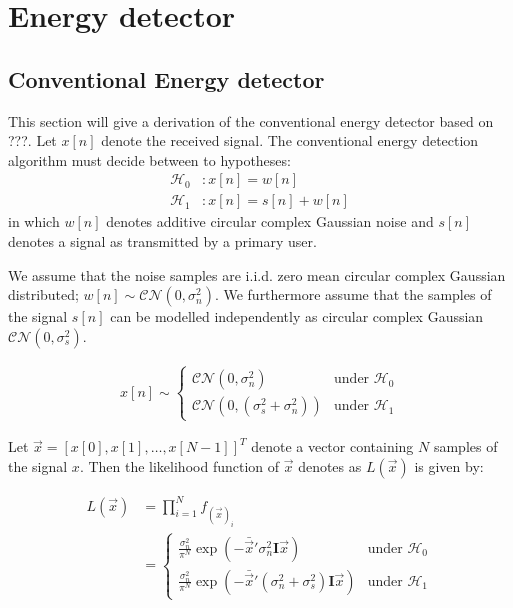 \documentclass[a4paper, openany, oneside]{memoir}
\begin{document}
\section{Energy detector}

\subsection{Conventional Energy detector}\label{ssec:conv_ed_derivation}
This section will give a derivation of the conventional energy detector based on ???.
Let $x[n]$ denote the received signal. The conventional energy detection algorithm must decide between to hypotheses:
\begin{align}\label{eq:hypotheses}
  \mathcal{H}_0&: x[n] = w[n]\\
  \mathcal{H}_1&: x[n] = s[n] + w[n]
\end{align}
in which $w[n]$ denotes additive circular complex Gaussian noise and $s[n]$ denotes a signal as transmitted by a primary user.

We assume that the noise samples are i.i.d. zero mean circular complex Gaussian distributed; $w[n] \sim \mathcal{CN}(0, \sigma_n^2)$. 
We furthermore assume that the samples of the signal $s[n]$ can be modelled independently as circular complex Gaussian $\mathcal{CN}(0, \sigma_s^2)$. %

\begin{align*}
x[n] \sim 
    \begin{cases}
        \mathcal{CN}(0, \sigma_n^2) & \text{under $\mathcal{H}_0$} \\
        \mathcal{CN}(0, (\sigma_s^2 + \sigma_n^2)) & \text{under $\mathcal{H}_1$}
    \end{cases}
\end{align*} 

Let $\vec{x} = \left[x[0], x[1], \ldots, x[N-1]\right]^T$ denote a vector containing $N$ samples of the signal $x$. Then the likelihood function of $\vec{x}$ denotes as $L(\vec{x})$ is given by:

\begin{align*}
    L(\vec{x}) &= \prod_{i=1}^N f_{(\vec{x})_i}\\
    &= \begin{cases}
        \frac{\sigma_n^2}{\pi^N } \exp(-\bar{\vec{x}}'\sigma_n^2\mathbf{I}\vec{x}) & \text{under $\mathcal{H}_0$} \\
        \frac{\sigma_n^2}{\pi^N } \exp(-\bar{\vec{x}}'(\sigma_n^2+\sigma_s^2)\mathbf{I}\vec{x}) & \text{under $\mathcal{H}_1$}
    \end{cases}
\end{align*}
\end{document}
